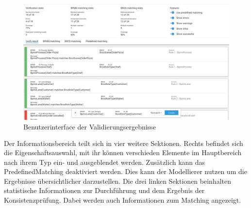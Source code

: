 \begin{figure}
    \centering
    \includegraphics[width=\textwidth,keepaspectratio]{../images/Screenshot-Result.png}%
    \caption{Benutzerinterface der Validierungsergebnisse}%
    \label{fig:screenshot-result}
\end{figure}

Der Informationsbereich teilt sich in vier weitere Sektionen.
Rechts befindet sich die Eigenschaftsauswahl, mit ihr können verschieden Elemente im Hauptbereich nach ihrem Typ ein- und ausgeblendet werden.
Zusätzlich kann das PredefinedMatching deaktiviert werden.
Dies kann der Modellierer nutzen um die Ergebnisse übersichtlicher darzustellen.
Die drei linken Sektionen beinhalten statistische Informationen zur Durchführung und dem Ergebnis der Konsistenzprüfung.
Dabei werden auch Informationen zum Matching angezeigt.


